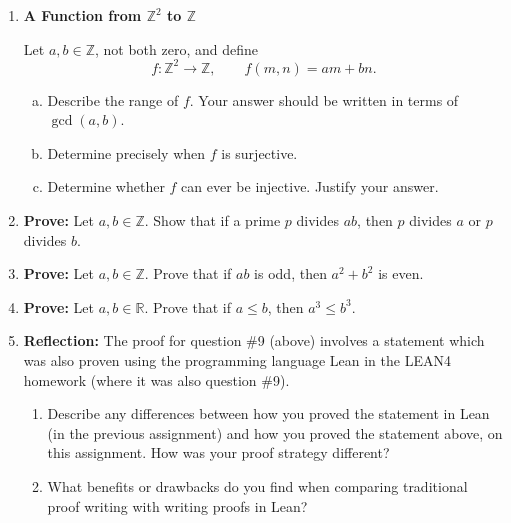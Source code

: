 \documentclass[12pt]{article}
\begin{document}
\begin{enumerate}
\begin{enumerate}[(a)]
\end{enumerate}

\bigskip

\item \textbf{A Function from \(\mathbb{Z}^2\) to \(\mathbb{Z}\)}

Let \(a,b \in \mathbb{Z}\), not both zero, and define
\[
f : \mathbb{Z}^2 \to \mathbb{Z}, \qquad f(m,n)=am+bn.
\]

\begin{enumerate}[(a)]

\item Describe the range of \(f\).  Your answer should be written in terms of \(\gcd(a,b)\).

\item Determine precisely when \(f\) is surjective.

\item Determine whether \(f\) can ever be injective.  Justify your answer.

\end{enumerate}

\bigskip 

\item \textbf{Prove:} Let $a,b \in \mathbb{Z}$. Show that if a prime $p$ divides $ab$, then $p$ divides $a$ or $p$ divides $b$.

\bigskip 

\item \textbf{Prove:} Let $a,b \in \mathbb{Z}$. Prove that if $ab$ is odd, then $a^2+b^2$ is even. 

\bigskip

\item \textbf{Prove:} Let $a,b \in \mathbb{R}$.  Prove that if $a \leq b$, then $a^3 \leq b^3$.

\bigskip 

\item \textbf{Reflection:}  The proof for question \#9 (above) involves a statement which was also proven using the programming language Lean in the LEAN4 homework (where it was also question \#9). 
\begin{enumerate}
    \item Describe any differences between how you proved the statement in Lean (in the previous assignment) and how you proved the statement above, on this assignment. How was your proof strategy different?
    \item What benefits or drawbacks do you find when comparing traditional proof writing with writing proofs in Lean?
\end{enumerate}  
\end{enumerate}
\end{document}

